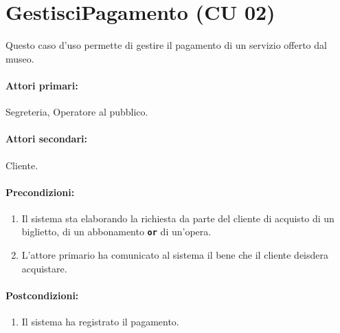 \documentclass{article}
\begin{document}
\section*{GestisciPagamento (CU 02)}

    \indent\indent Questo caso d'uso permette di gestire il pagamento di un servizio offerto dal museo.
    
    \paragraph{Attori primari:}Segreteria, Operatore al pubblico.
	
	\paragraph{Attori secondari:}Cliente.
	
	\paragraph{Precondizioni:}
	\begin{enumerate}[itemsep=8pt,parsep=0pt]
		\item Il sistema sta elaborando la richiesta da parte del cliente di acquisto di un biglietto, di un abbonamento \texttt{\textbf{or}} di un'opera.
		\item L'attore primario ha comunicato al sistema il bene che il cliente deisdera acquistare.
	\end{enumerate}
	
	\paragraph{Postcondizioni:}
		\begin{enumerate}[itemsep=8pt,parsep=0pt]
			\item Il sistema ha registrato il pagamento.
		\end{enumerate}
	
\end{document}
